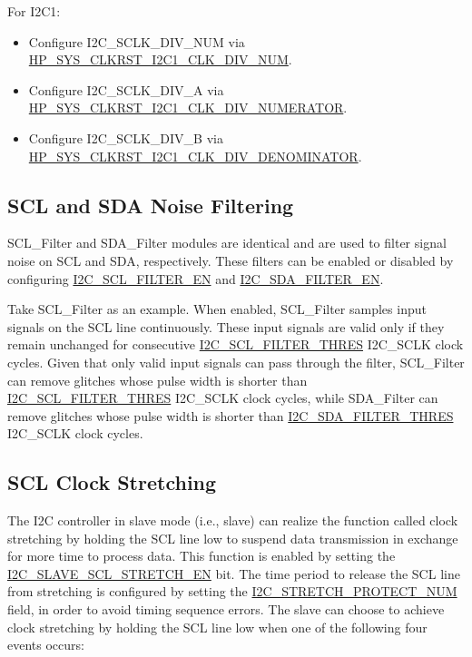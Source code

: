 \documentclass[main\_\_EN.tex]{subfiles}
\begin{document}
For I2C1:
\begin{itemize}
    \item Configure I2C\_SCLK\_DIV\_NUM via \hyperref[fielddesc:HPSYSCLKRSTI2C1CLKDIVNUM]{HP\_SYS\_CLKRST\_I2C1\_CLK\_DIV\_NUM}.
    \item Configure I2C\_SCLK\_DIV\_A via \hyperref[fielddesc:HPSYSCLKRSTI2C1CLKDIVNUMERATOR]{HP\_SYS\_CLKRST\_I2C1\_CLK\_DIV\_NUMERATOR}.
    \item Configure I2C\_SCLK\_DIV\_B via \hyperref[fielddesc:HPSYSCLKRSTI2C1CLKDIVDENOMINATOR]{HP\_SYS\_CLKRST\_I2C1\_CLK\_DIV\_DENOMINATOR}.
\end{itemize}

\subsection{SCL and SDA Noise Filtering}
SCL\_Filter and SDA\_Filter modules are identical and are used to filter signal noise on SCL and SDA, respectively. These filters can be enabled or disabled by configuring \hyperref[fielddesc:I2CSCLFILTEREN]{I2C\_SCL\_FILTER\_EN} and \hyperref[fielddesc:I2CSDAFILTEREN]{I2C\_SDA\_FILTER\_EN}.

Take SCL\_Filter as an example. When enabled, SCL\_Filter samples input signals on the SCL line continuously. These input signals are valid only if they remain unchanged for consecutive \hyperref[fielddesc:I2CSCLFILTERTHRES]{I2C\_SCL\_FILTER\_THRES} I2C\_SCLK clock cycles. Given that only valid input signals can pass through the filter, SCL\_Filter can remove glitches whose pulse width is shorter than \hyperref[fielddesc:I2CSCLFILTERTHRES]{I2C\_SCL\_FILTER\_THRES} I2C\_SCLK clock cycles, while SDA\_Filter can remove glitches whose pulse width is shorter than \hyperref[fielddesc:I2CSDAFILTERTHRES]{I2C\_SDA\_FILTER\_THRES} I2C\_SCLK clock cycles.

\subsection{SCL Clock Stretching}
The I2C controller in slave mode (i.e., slave) can realize the function called clock stretching by holding the SCL line low to suspend data transmission in exchange for more time to process data. This function is enabled by setting the \hyperref[fielddesc:I2CSLAVESCLSTRETCHEN]{I2C\_SLAVE\_SCL\_STRETCH\_EN} bit. The time period to release the SCL line from stretching is configured by setting the \hyperref[fielddesc:I2CSTRETCHPROTECTNUM]{I2C\_STRETCH\_PROTECT\_NUM} field, in order to avoid timing sequence errors.
The slave can choose to achieve clock stretching by holding the SCL line low when one of the following four events occurs:
\end{document}
